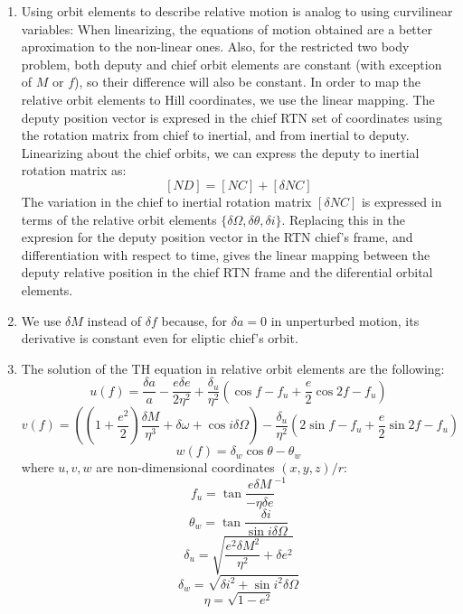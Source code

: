 \documentclass[a4paper]{article}
\begin{document}
\begin{enumerate}[label=\emph{\alph*)}]
  \item %
    Using orbit elements to describe relative motion is analog to using curvilinear variables: When linearizing, the equations of motion obtained are a better aproximation to the non-linear ones. Also, for the restricted two body problem, both deputy and chief orbit elements are constant (with exception of $M$ or $f$), so their difference will also be constant. In order to map the relative orbit elements to Hill coordinates, we use the linear mapping. The deputy position vector is expresed in the chief RTN set of coordinates using the rotation matrix from chief to inertial, and from inertial to deputy. Linearizing about the chief orbits, we can express the deputy to inertial rotation matrix as:\\
    \[[ND]=[NC]+[\delta NC]\]
    The variation in the chief to inertial rotation matrix $[\delta NC]$ is expressed in terms of the relative orbit elements $\{\delta\Omega,\delta\theta, \delta i\}$. Replacing this in the expresion for the deputy position vector in the RTN chief's frame, and differentiation with respect to time, gives the linear mapping between the deputy relative position in the chief RTN frame and the diferential orbital elements.

  \item %
    We use $\delta M$ instead of $\delta f$ because, for $\delta a = 0$ in unperturbed motion, its derivative is constant even for eliptic chief's orbit.
 
  \item %
    The solution of the TH equation in relative orbit elements are the following:
    \[u(f) = \frac{\delta a}{a} - \frac{e \delta e}{2\eta^2}+\frac{\delta_u}{\eta^2} \left(\cos{f-f_u}+\frac{e}{2}\cos{2f-f_u} \right) \]
    \[v(f) = \left( \left(1+\frac{e^2}{2}\right) \frac{\delta M}{\eta^3}+\delta \omega + \cos{i\delta\Omega}\right) - \frac{\delta_u}{\eta^2}\left( 2\sin{f-f_u}+\frac{e}{2}\sin{2f-f_u}\right)\]
    \[w(f) = \delta_w\cos{\theta-\theta_w} \]
    where $u,v,w$ are non-dimensional coordinates $(x,y,z)/r$: 
    \[f_u = \tan{\frac{e\delta M}{-\eta\delta e}}^{-1}\]
    \[\theta_w = \tan{\frac{\delta i}{\sin{i \delta \Omega}}} \]
    \[\delta_u = \sqrt{\frac{e^2\delta M^2}{\eta^2}+\delta e^2} \]
    \[\delta_w = \sqrt{\delta i^2+\sin{i}^2\delta\Omega} \]
    \[\eta = \sqrt{1-e^2} \]


\end{enumerate}
\end{document}
